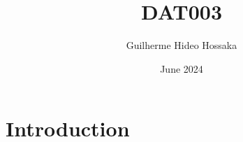 \documentclass{article}
\title{DAT003}
\author{Guilherme Hideo Hossaka}
\date{June 2024}
\begin{document}
\maketitle

\section{Introduction}
\end{document}
